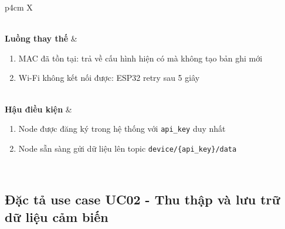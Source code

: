 \begin{table}[H]
\begin{tabularx}{\textwidth}{p{4cm} X}
\begin{minipage}[t]{\linewidth}
      \end{minipage} \\
    \textbf{Luồng thay thế} &
      \begin{minipage}[t]{\linewidth}
        \begin{enumerate}[leftmargin=*, topsep=0pt]
          \item[3a.] MAC đã tồn tại: trả về cấu hình hiện có mà không
            tạo bản ghi mới
          \item[1a.] Wi-Fi không kết nối được: ESP32 retry sau 5 giây
        \end{enumerate}
      \end{minipage} \\
    \textbf{Hậu điều kiện} &
      \begin{minipage}[t]{\linewidth}
        \begin{enumerate}[leftmargin=*, topsep=0pt]
          \item Node được đăng ký trong hệ thống với \texttt{api\_key}
            duy nhất
          \item Node sẵn sàng gửi dữ liệu lên topic
            \texttt{device/\{api\_key\}/data}
        \end{enumerate}
      \end{minipage} \\
    \bottomrule
  \end{tabularx}
\end{table}

\subsection{Đặc tả use case UC02 - Thu thập và lưu trữ dữ liệu
cảm biến}
\label{subsec:survey:uc02}

